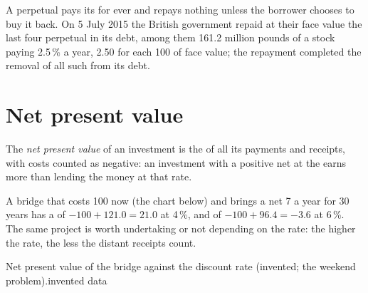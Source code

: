 \begin{record}
A perpetual  pays its  for ever and repays nothing unless the borrower chooses to buy it back. On 5 July 2015 the British government repaid at their face value
the last four perpetual  in its debt, among them 161.2 million pounds of a stock paying 2.5\,\% a year, 2.50 for each 100 of face value; the repayment completed the
removal of all such  from its debt.
\end{record}

\section{Net present value}\label{sec:g12:present-value:npv}

\begin{definition}\label{def:g12:present-value:npv}
The \emph{net present value} of an investment is the  of all its payments and receipts, with costs counted as negative: an investment
with a positive net  at the  earns more than lending the money at that rate.
\end{definition}

A bridge that costs 100 now (the chart below) and brings a net 7 a year for 30 years has a  of $-100 + 121.0 = 21.0$ at 4\,\%, and of $-100 + 96.4 = -3.6$ at 6\,\%. The same
project is worth undertaking or not depending on the rate: the higher the rate, the less the distant receipts count.

\begin{omchart}{Net present value of the bridge against the discount rate (invented; the weekend problem).}{invented data}
\end{omchart}

